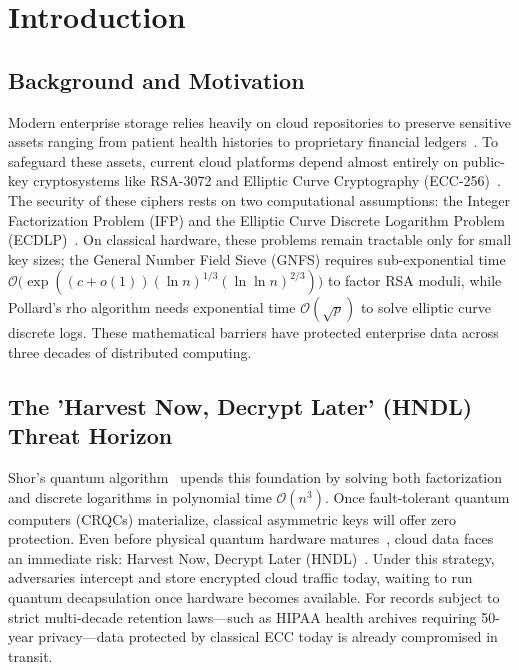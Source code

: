 \documentclass[pdflatex,sn-mathphys,Numbered]{sn-jnl}%
\theoremstyle{thmstyleone}%
\theoremstyle{thmstyletwo}%
\theoremstyle{thmstylethree}%
\begin{document}

\maketitle

\section{Introduction}\label{sec:intro}

\subsection{\textbf{Background and Motivation}}
Modern enterprise storage relies heavily on cloud repositories to preserve sensitive assets ranging from patient health histories to proprietary financial ledgers~\cite{mell2011nist}. To safeguard these assets, current cloud platforms depend almost entirely on public-key cryptosystems like RSA-3072 and Elliptic Curve Cryptography (ECC-256)~\cite{boneh2020graduate}. The security of these ciphers rests on two computational assumptions: the Integer Factorization Problem (IFP) and the Elliptic Curve Discrete Logarithm Problem (ECDLP)~\cite{katz2020introduction}. On classical hardware, these problems remain tractable only for small key sizes; the General Number Field Sieve (GNFS) requires sub-exponential time $\mathcal{O}\big(\exp((c + o(1)) (\ln n)^{1/3} (\ln \ln n)^{2/3})\big)$ to factor RSA moduli, while Pollard's rho algorithm needs exponential time $\mathcal{O}(\sqrt{p})$ to solve elliptic curve discrete logs. These mathematical barriers have protected enterprise data across three decades of distributed computing.

\subsection{\textbf{The 'Harvest Now, Decrypt Later' (HNDL) Threat Horizon}}
Shor's quantum algorithm~\cite{shor1994algorithms} upends this foundation by solving both factorization and discrete logarithms in polynomial time $\mathcal{O}(n^3)$. Once fault-tolerant quantum computers (CRQCs) materialize, classical asymmetric keys will offer zero protection. Even before physical quantum hardware matures~\cite{mosca2022quantum}, cloud data faces an immediate risk: Harvest Now, Decrypt Later (HNDL)~\cite{chen2016report}. Under this strategy, adversaries intercept and store encrypted cloud traffic today, waiting to run quantum decapsulation once hardware becomes available. For records subject to strict multi-decade retention laws---such as HIPAA health archives requiring 50-year privacy---data protected by classical ECC today is already compromised in transit.
\end{document}
